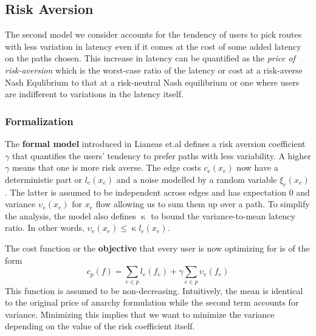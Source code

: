 \subsection{Risk Aversion}
The second model we consider accounts for the
tendency of users to pick routes with less variation in latency even if it comes at the cost of some added
latency on the paths chosen. This increase in latency can be quantified as the {\em{price of risk-aversion}}
which is the worst-case ratio of the latency or cost at a risk-averse Nash Equlibrium to that at a risk-neutral
Nash equilibrium or one where users are indifferent to variations in the latency itself.


\subsubsection{Formalization} The {\textbf{formal model}} introduced in Lianeas et.al \cite{risk-averse} defines 
a risk aversion coefficient $\gamma$ that quantifies the users' tendency to prefer paths with less variability. 
A higher $\gamma$ means that one is more risk averse. The edge costs $c_e(x_e)$ now have a deterministic part 
or $l_e(x_e)$ and a noise modelled by a random variable $\xi_e(x_e)$. The latter is assumed to be independent across edges 
and has expectation $0$ and variance $\upsilon_e(x_e)$ for $x_e$ flow allowing us to sum them up over a path. To simplify 
the analysis, the model also defines $\upkappa$ to bound the variance-to-mean latency ratio. In other words, 
$\upsilon_e(x_e) \leq \upkappa l_e(x_e)$.

The cost function or the {\textbf{objective}} that every user is now optimizing for is of the form
$$c_p(f) = \sum_{e \in p}l_e(f_e) + \gamma \sum_{e \in p}\upsilon_e(f_e)$$
This function is assumed to be non-decreasing. Intuitively, the mean is identical to the original price of anarchy formulation
while the second term accounts for variance. Minimizing this implies that we want to minimize the variance depending on the
value of the risk coefficient itself.

